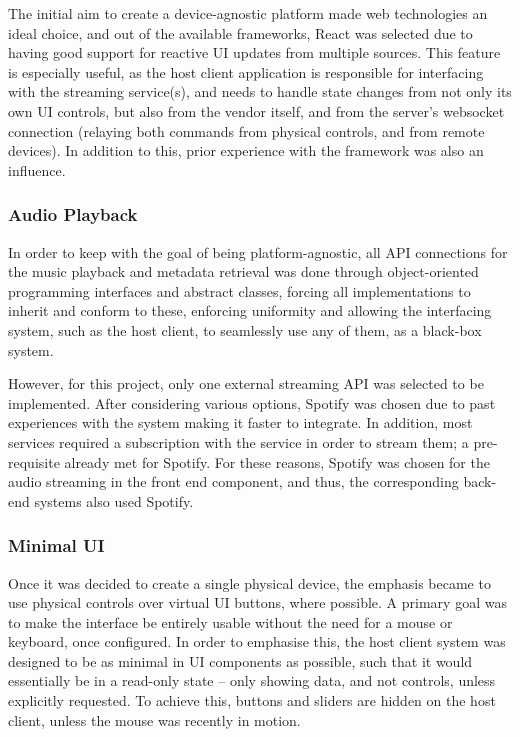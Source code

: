                The initial aim to create a device-agnostic platform made web technologies an ideal choice, and out of the available frameworks, React was selected due to having good support for reactive UI updates from multiple sources. This feature is especially useful, as the host client application is responsible for interfacing with the streaming service(s), and needs to handle state changes from not only its own UI controls, but also from the vendor itself, and from the server's websocket connection (relaying both commands from physical controls, and from remote devices). In addition to this, prior experience with the framework was also an influence.
                
            
            \subsubsection{Audio Playback}
    
                In order to keep with the goal of being platform-agnostic, all API connections for the music playback and metadata retrieval was done through object-oriented programming interfaces and abstract classes, forcing all implementations to inherit and conform to these, enforcing uniformity and allowing the interfacing system, such as the host client, to seamlessly use any of them, as a black-box system.
    
                However, for this project, only one external streaming API was selected to be implemented. After considering various options, Spotify was chosen due to past experiences with the system making it faster to integrate. In addition, most services required a subscription with the service in order to stream them; a pre-requisite already met for Spotify. For these reasons, Spotify was chosen for the audio streaming in the front end component, and thus, the corresponding back-end systems also used Spotify.
    
            \subsubsection{Minimal UI}
    
                Once it was decided to create a single physical device, the emphasis became to use physical controls over virtual UI buttons, where possible. A primary goal was to make the interface be entirely usable without the need for a mouse or keyboard, once configured. In order to emphasise this, the host client system was designed to be as minimal in UI components as possible, such that it would essentially be in a read-only state -- only showing data, and not controls, unless explicitly requested. To achieve this, buttons and sliders are hidden on the host client, unless the mouse was recently in motion.
    
